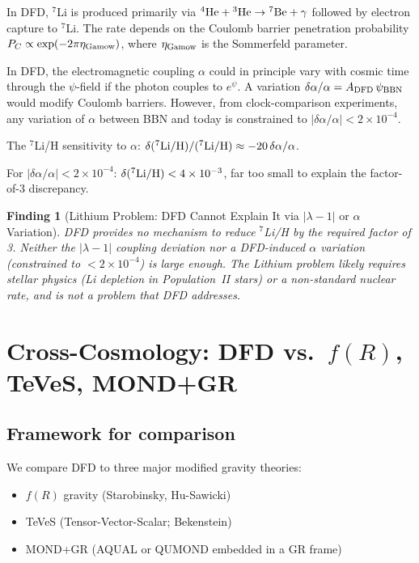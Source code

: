 \documentclass[11pt]{article}
\newtheorem{finding}{Finding}
\newcommand{\ee}[1]{\times 10^{#1}}
\newcommand{\alphafine}{\alpha}
\newcommand{\lambdaone}{|\lambda-1|}
\newcommand{\DFD}{{\rm DFD}}
\begin{document}
In DFD, $^7$Li is produced primarily via ${}^4{\rm He} + {}^3{\rm He} \to {}^7{\rm Be}
+ \gamma$ followed by electron capture to $^7$Li.  The rate depends on
the Coulomb barrier penetration probability $P_C \propto \exp(-2\pi\eta_{\rm Gamow})$,
where $\eta_{\rm Gamow}$ is the Sommerfeld parameter.

In DFD, the electromagnetic coupling $\alphafine$ could in principle vary
with cosmic time through the $\psi$-field if the photon couples to $e^\psi$.
A variation $\delta\alphafine/\alphafine = A_\DFD\,\psi_{\rm BBN}$ would
modify Coulomb barriers.  However, from clock-comparison experiments, any
variation of $\alphafine$ between BBN and today is constrained to
$|\delta\alphafine/\alphafine| < 2\ee{-4}$.

The $^7$Li/H sensitivity to $\alphafine$:
$\delta(^7{\rm Li/H})/(^7{\rm Li/H}) \approx -20\,\delta\alphafine/\alphafine$.

For $|\delta\alphafine/\alphafine| < 2\ee{-4}$: $\delta(^7{\rm Li/H}) < 4\ee{-3}$,
far too small to explain the factor-of-3 discrepancy.

\begin{finding}[Lithium Problem: DFD Cannot Explain It via $\lambdaone$ or $\alphafine$ Variation]
DFD provides no mechanism to reduce $^7$Li/H by the required factor of 3.
Neither the $\lambdaone$ coupling deviation nor a DFD-induced $\alphafine$
variation (constrained to $< 2\ee{-4}$) is large enough.  The Lithium
problem likely requires stellar physics (Li depletion in Population~II
stars) or a non-standard nuclear rate, and is not a problem that DFD
addresses.
\end{finding}

\section{Cross-Cosmology: DFD vs.\ $f(R)$, TeVeS, MOND+GR}
\label{sec:cross-cosmo}

\subsection{Framework for comparison}

We compare DFD to three major modified gravity theories:
\begin{itemize}[nosep]
  \item $f(R)$ gravity (Starobinsky, Hu-Sawicki)
  \item TeVeS (Tensor-Vector-Scalar; Bekenstein)
  \item MOND+GR (AQUAL or QUMOND embedded in a GR frame)
\end{itemize}
\end{document}
